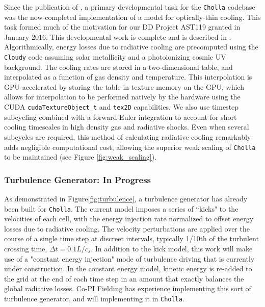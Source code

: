\documentclass[11pt,letterpaper,english]{article}
\begin{document}
Since the publication of \cite{Schneider15}, a primary developmental task for the {\tt Cholla} codebase was
 the now-completed implementation of a model for optically-thin cooling. This task formed much of the motivation for
our DD Project AST119 granted in January 2016. This developmental work is complete and is
described in \cite{Schneider17}. Algorithmically, energy losses due to radiative cooling are precomputed using the
{\tt Cloudy} code \cite{Ferland13} assuming solar metallicity and a photoionizing
cosmic UV background. The cooling rates are stored in a two-dimensional table,
and interpolated as a function of gas density and temperature. This interpolation 
is GPU-accelerated by storing the table in texture memory on the GPU, which allows
for interpolation to be performed natively by the hardware using the CUDA {\tt cudaTextureObject\_t} and {\tt tex2D} capabilities.
We also use timestep subcycling combined with a forward-Euler integration to account for short cooling timescales in high density gas and radiative shocks. Even when several subcycles are required, this method of calculating radiative cooling remarkably adds negligible computational cost, allowing the superior
weak scaling of {\tt Cholla} to be maintained (see Figure \ref{fig:weak_scaling}).

\vspace{-.2in}
\subsubsection{Turbulence Generator: In Progress}
\vspace{-.25in}

As demonstrated in Figure\ref{fig:turbulence}, a turbulence generator has already been built for {\tt Cholla}. The current model imposes a series of ``kicks" to the velocities of each cell, with the energy injection rate normalized to offset energy losses due to radiative cooling. The velocity perturbations are applied over the course of a single time step at discreet intervals, typically 1/10th of the turbulent crossing time, $\Delta t = 0.1 L / c_s$. In addition to the kick model, this work will make use of a "constant energy injection" mode of turbulence driving that is currently under construction. In the constant energy model, kinetic energy is re-added to the grid at the end of each time step in an amount that exactly balances the global radiative losses. Co-PI Fielding has experience implementing this sort of turbulence generator, and will implementing it in {\tt Cholla}.
\end{document}
